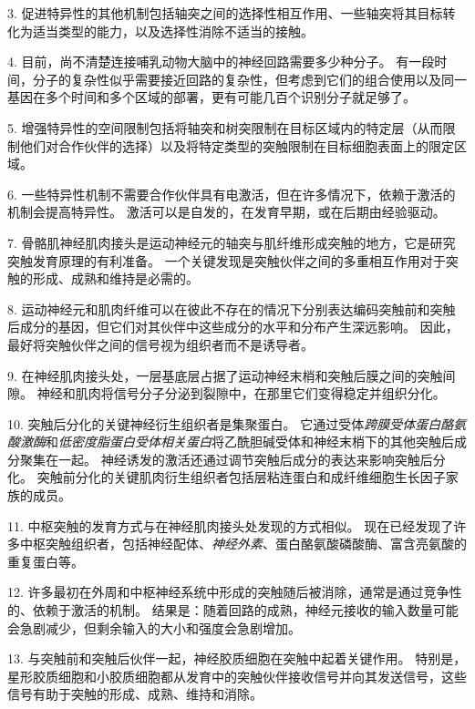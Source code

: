3. 促进特异性的其他机制包括轴突之间的选择性相互作用、一些轴突将其目标转化为适当类型的能力，以及选择性消除不适当的接触。


4. 目前，尚不清楚连接哺乳动物大脑中的神经回路需要多少种分子。
有一段时间，分子的复杂性似乎需要接近回路的复杂性，但考虑到它们的组合使用以及同一基因在多个时间和多个区域的部署，更有可能几百个识别分子就足够了。


5. 增强特异性的空间限制包括将轴突和树突限制在目标区域内的特定层（从而限制他们对合作伙伴的选择）以及将特定类型的突触限制在目标细胞表面上的限定区域。


6. 一些特异性机制不需要合作伙伴具有电激活，但在许多情况下，依赖于激活的机制会提高特异性。
激活可以是自发的，在发育早期，或在后期由经验驱动。 


7. 骨骼肌神经肌肉接头是运动神经元的轴突与肌纤维形成突触的地方，它是研究突触发育原理的有利准备。
一个关键发现是突触伙伴之间的多重相互作用对于突触的形成、成熟和维持是必需的。


8. 运动神经元和肌肉纤维可以在彼此不存在的情况下分别表达编码突触前和突触后成分的基因，但它们对其伙伴中这些成分的水平和分布产生深远影响。
因此，最好将突触伙伴之间的信号视为组织者而不是诱导者。


9. 在神经肌肉接头处，一层基底层占据了运动神经末梢和突触后膜之间的突触间隙。
神经和肌肉将信号分子分泌到裂隙中，在那里它们变得稳定并组织分化。


10. 突触后分化的关键神经衍生组织者是集聚蛋白。
它通过受体\textit{跨膜受体蛋白酪氨酸激酶}和\textit{低密度脂蛋白受体相关蛋白}将乙酰胆碱受体和神经末梢下的其他突触后成分聚集在一起。
神经诱发的激活还通过调节突触后成分的表达来影响突触后分化。
突触前分化的关键肌肉衍生组织者包括层粘连蛋白和成纤维细胞生长因子家族的成员。


11. 中枢突触的发育方式与在神经肌肉接头处发现的方式相似。
现在已经发现了许多中枢突触组织者，包括神经配体、\textit{神经外素}、蛋白酪氨酸磷酸酶、富含亮氨酸的重复蛋白等。


12. 许多最初在外周和中枢神经系统中形成的突触随后被消除，通常是通过竞争性的、依赖于激活的机制。
结果是：随着回路的成熟，神经元接收的输入数量可能会急剧减少，但剩余输入的大小和强度会急剧增加。


13. 与突触前和突触后伙伴一起，神经胶质细胞在突触中起着关键作用。
特别是，星形胶质细胞和小胶质细胞都从发育中的突触伙伴接收信号并向其发送信号，这些信号有助于突触的形成、成熟、维持和消除。


